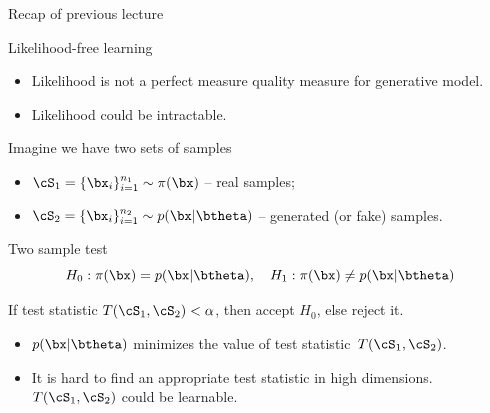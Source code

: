 

\begin{frame}
\titlepage
\end{frame}
\begin{frame}{Recap of previous lecture}
	\begin{block}{Likelihood-free learning}
		\begin{itemize}
			\item Likelihood is not a perfect measure quality measure for generative model.
			\item Likelihood could be intractable.
		\end{itemize}
	\end{block}
	Imagine we have two sets of samples 
	\begin{itemize}
		\item $\cS_1 = \{\bx_i\}_{i=1}^{n_1} \sim \pi(\bx)$ -- real samples;
		\item $\cS_2 = \{\bx_i\}_{i=1}^{n_2} \sim p(\bx | \btheta)$ -- generated (or fake) samples.
	\end{itemize}
	\begin{block}{Two sample test}
		\vspace{-0.3cm}
		\[
			H_0: \pi(\bx) = p(\bx | \btheta), \quad H_1: \pi(\bx) \neq p(\bx | \btheta)
		\]
	\end{block}
	If test statistic $T(\cS_1, \cS_2) < \alpha$, then accept $H_0$, else reject it.
		\begin{itemize}
			\item $p(\bx | \btheta)$ minimizes the value of test statistic~$T(\cS_1, \cS_2)$.
			\item It is hard to find an appropriate test statistic in high dimensions. $T(\cS_1, \cS_2)$ could be learnable.
		\end{itemize}
\end{frame}
